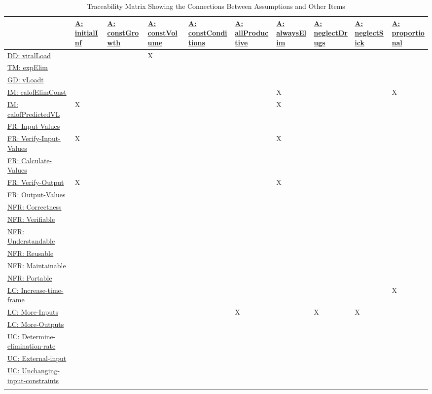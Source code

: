 \documentclass[12pt]{article}
\begin{document}
\begin{longtable}{l l l l l l l l l l}
\toprule
\textbf{} & \textbf{\hyperref[initialInf]{A: initialInf}} & \textbf{\hyperref[constGrowth]{A: constGrowth}} & \textbf{\hyperref[constVolume]{A: constVolume}} & \textbf{\hyperref[constConditions]{A: constConditions}} & \textbf{\hyperref[allProductive]{A: allProductive}} & \textbf{\hyperref[alwaysElim]{A: alwaysElim}} & \textbf{\hyperref[neglectDrugs]{A: neglectDrugs}} & \textbf{\hyperref[neglectSick]{A: neglectSick}} & \textbf{\hyperref[proportional]{A: proportional}}
\\
\midrule
\endhead
\hyperref[DD:viralLoad]{DD: viralLoad} &  &  & X &  &  &  &  &  & 
\\
\hyperref[TM:expElim]{TM: expElim} &  &  &  &  &  &  &  &  & 
\\
\hyperref[GD:vLoadt]{GD: vLoadt} &  &  &  &  &  &  &  &  & 
\\
\hyperref[IM:calofElimConst]{IM: calofElimConst} &  &  &  &  &  & X &  &  & X
\\
\hyperref[IM:calofPredictedVL]{IM: calofPredictedVL} & X &  &  &  &  & X &  &  & 
\\
\hyperref[inputValues]{FR: Input-Values} &  &  &  &  &  &  &  &  & 
\\
\hyperref[verifyInput]{FR: Verify-Input-Values} & X &  &  &  &  & X &  &  & 
\\
\hyperref[calcValues]{FR: Calculate-Values} &  &  &  &  &  &  &  &  & 
\\
\hyperref[verifyOutput]{FR: Verify-Output} & X &  &  &  &  & X &  &  & 
\\
\hyperref[outputValues]{FR: Output-Values} &  &  &  &  &  &  &  &  & 
\\
\hyperref[correctness]{NFR: Correctness} &  &  &  &  &  &  &  &  & 
\\
\hyperref[verifiable]{NFR: Verifiable} &  &  &  &  &  &  &  &  & 
\\
\hyperref[understandable]{NFR: Understandable} &  &  &  &  &  &  &  &  & 
\\
\hyperref[reusable]{NFR: Reusable} &  &  &  &  &  &  &  &  & 
\\
\hyperref[maintainable]{NFR: Maintainable} &  &  &  &  &  &  &  &  & 
\\
\hyperref[portable]{NFR: Portable} &  &  &  &  &  &  &  &  & 
\\
\hyperref[incTimeFrame]{LC: Increase-time-frame} &  &  &  &  &  &  &  &  & X
\\
\hyperref[moreInputs]{LC: More-Inputs} &  &  &  &  & X &  & X & X & 
\\
\hyperref[moreOutputs]{LC: More-Outputs} &  &  &  &  &  &  &  &  & 
\\
\hyperref[detElimRate]{UC: Determine-elimination-rate} &  &  &  &  &  &  &  &  & 
\\
\hyperref[externalInput]{UC: External-input} &  &  &  &  &  &  &  &  & 
\\
\hyperref[inConstraints]{UC: Unchanging-input-constraints} &  &  &  &  &  &  &  &  & 
\\
\bottomrule
\caption{Traceability Matrix Showing the Connections Between Assumptions and Other Items}
\label{Table:TraceMatAvsAll}
\end{longtable}
\end{document}

